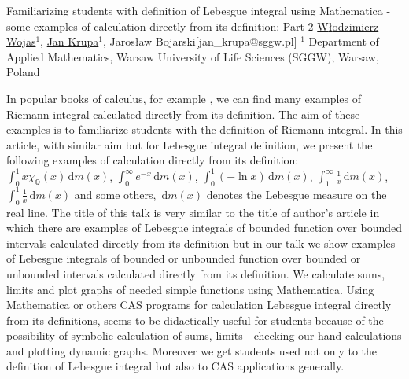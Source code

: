 


\begin{abstract_online}{Familiarizing students with definition of Lebesgue integral  using Mathematica - some examples of calculation directly from its definition: Part 2}{%
        \underline{W{\l}odzimierz Wojas}$^{1}$, \underline{Jan Krupa}$^{1}$,  Jaros{\l}aw Bojarski}{[jan\_krupa@sggw.pl]
        }{%
        $^1$ Department of Applied Mathematics, Warsaw University of Life Sciences (SGGW), Warsaw, Poland}




\theoremstyle{definition}
\newtheorem{defin}{Definition}

\newcommand{\R}{\mathbb{R}}
\newcommand{\Q}{\mathbb{Q}}
\newcommand{\ds}{\displaystyle}
\newcommand{\dx}{\,\mathrm{d}}



In popular books of calculus, for example \cite{Apostol, Ficht}, we can find many examples of Riemann integral calculated directly from its definition. The aim of these examples is to familiarize students with the definition of Riemann integral.  In this article, with similar aim but for Lebesgue integral definition,  we present the following examples of calculation directly from its definition: $\ds \int_0^1 x\chi_{\Q}(x) \dx m(x)$, $\ds \int_0^{\infty} e^{-x} \dx m(x)$, $\ds \int_0^{1} (-\ln x) \dx m(x)$, $\ds \int_1^{\infty} \frac{1}{x} \dx m(x)$, $\ds \int_0^{1} \frac{1}{x} \dx m(x)$ and some others, $\ds \dx m(x)$ denotes the Lebesgue measure on the real line.
 The title of this talk is very similar to the title of author's article \cite{WojasKrupa} in  which  there are examples of Lebesgue integrals of bounded function over bounded intervals calculated directly from its definition but in our talk we show examples of Lebesgue integrals of bounded or unbounded function over bounded or  unbounded intervals calculated directly from its definition.
We calculate sums, limits and plot graphs of needed simple functions using Mathematica. Using Mathematica or others CAS programs for calculation Lebesgue integral directly from its definitions, seems to be didactically useful for students because of the possibility of symbolic calculation of sums, limits - checking our hand calculations and plotting dynamic graphs. Moreover we  get students used not only to the definition of Lebesgue integral but also to CAS applications generally.


\end{abstract_online}
